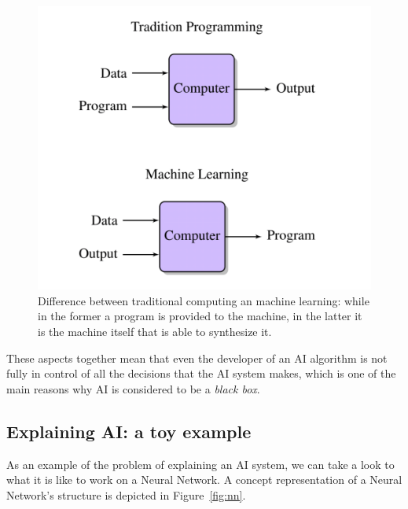 \documentclass[conference]{IEEEtran}
\begin{document}
\begin{figure}[ht!] \centering \includegraphics[width=0.8 \linewidth]{images/ml.png}
    \caption{Difference between traditional computing an machine learning: while in the former a program is provided to the machine, in the latter it is the machine itself that is able to synthesize it.}
    \label{fig:ml} \end{figure}


These aspects together mean that even the developer of an AI algorithm is not fully in control of all the decisions that the AI system makes, which is one of the main reasons why AI is considered to be a \textit{black box}.


\subsection{Explaining AI: a toy example}
\label{sec:example}

As an example of the problem of explaining an AI system, we can take a look to what it is like to work on a Neural Network. A concept representation of a
Neural Network's structure is depicted in Figure~\ref{fig:nn}.
\end{document}
